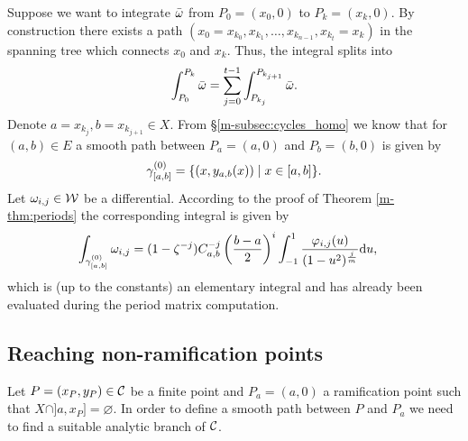 \documentclass[main.tex]{subfiles}
\begin{document}
  Suppose we want to integrate $\bar{\omega}$ from $P_0 =(x_0,0)$ to $P_k = (x_k,0)$. By construction there exists a path
 $(x_0=x_{k_0},x_{k_1},\dots,x_{k_{n-1}},x_{k_t}=x_k)$ in the spanning tree which connects $x_0$ and $x_k$. Thus, the integral splits into
  \begin{align}
    \int_{P_0}^{P_k} \bar{\omega} = \sum_{j = 0}^{t-1}  \int_{P_{k_j}}^{P_{k_{j+1}}} \bar{\omega}.
  \end{align}
  Denote $a = x_{k_j}, b = x_{k_{j+1}} \in X$. From \S \ref{m-subsec:cycles_homo} we know that for $(a,b) \in E$ a smooth path between $P_a=(a,0)$ and $P_b=(b,0)$ is given by
  \begin{align*}
   \gamma_{[a,b]}^{(0)} = \{  (x,y_{a,b}(x))  \mid  x \in [a,b]  \}.
  \end{align*}
  Let $\omega_{i,j} \in \mathcal{W}$ be a differential. According to the proof of Theorem \ref{m-thm:periods} the corresponding integral is given by
  \begin{align}
   \int_{\gamma_{[a,b]}^{(0)}} \omega_{i,j}  & = 
   (1-\zeta^{-j}) C_{a,b}^{-j} \left(\frac{b-a}{2}\right)^i \int_{-1}^1 \frac{\varphi_{i,j}(u)}{(1-u^2)^{\frac{j}{m}}}  \mathrm d u,
  \end{align}
  which is  (up to the constants) an elementary integral and has already been evaluated during the period matrix computation.


  \subsection{Reaching non-ramification points}\label{subsec:ajm_finite}

  Let $P = (x_P,y_P) \in \mathcal{C}$ be a finite point and $P_a = (a,0)$ a ramification point such that $X\cap]a,x_P]=\varnothing$. In order to define a smooth path between $P$ and $P_a$ 
  we need to find a suitable analytic branch of $\mathcal{C}$. 
  
\end{document}
